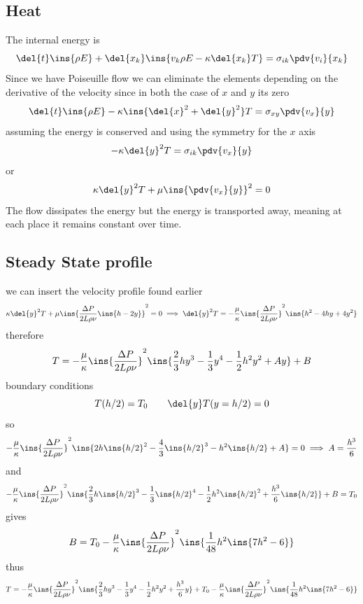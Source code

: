 \subsection{Heat}
The internal energy is 
\begin{equation}
	\del{t}\ins{\rho E}+\del{x_k}\ins{v_k\rho E - \kappa \del{x_k}T} = \sigma_{ik}\pdv{v_i}{x_k}
\end{equation}
Since we have Poiseuille flow  we can eliminate the elements depending on the derivative of the velocity since in both the case of \(x\) and \(y\) its zero
\begin{equation}
	\del{t}\ins{\rho E}-\kappa\ins{\del{x}^2+\del{y}^2}T = \sigma_{xy}\pdv{v_x}{y}
\end{equation}
assuming the energy is conserved and using the symmetry for the \(x\) axis
\begin{equation}
	-\kappa\del{y}^2T = \sigma_{ik}\pdv{v_x}{y}
\end{equation}
or 
\begin{equation}
	\kappa\del{y}^2T + \mu\ins{\pdv{v_x}{y}}^2=0
\end{equation}
The flow dissipates the energy but the energy is transported away, meaning at each place it remains constant over time.
\subsection{Steady State profile}
we can insert the velocity profile found earlier
\begin{equation}
	\kappa\del{y}^2T + \mu\ins{\frac{\Delta P}{2L\rho\nu}\ins{h-2y}}^2=0 \implies \del{y}^2T = -\frac{\mu}{\kappa}\ins{\frac{\Delta P}{2L\rho\nu}}^2\ins{h^2-4hy+4y^2}
\end{equation}
therefore
\begin{equation}
	T = -\frac{\mu}{\kappa}\ins{\frac{\Delta P}{2L\rho\nu}}^2\ins{\frac{2}{3}hy^3-\frac{1}{3}y^4-\frac{1}{2}h^2y^2+Ay}+B
\end{equation}
boundary conditions
\begin{equation}
	T(h/2)=T_0 \qquad \del{y}T(y=h/2)=0
\end{equation}
so 
\begin{equation}
	-\frac{\mu}{\kappa}\ins{\frac{\Delta P}{2L\rho\nu}}^2\ins{2h\ins{h/2}^2-\frac{4}{3}\ins{h/2}^3-h^2\ins{h/2}+A}=0 \implies A=\frac{h^3}{6}
\end{equation}
and
\begin{equation}
	-\frac{\mu}{\kappa}\ins{\frac{\Delta P}{2L\rho\nu}}^2\ins{\frac{2}{3}h\ins{h/2}^3-\frac{1}{3}\ins{h/2}^4-\frac{1}{2}h^2\ins{h/2}^2+\frac{h^3}{6}\ins{h/2}}+B=T_0
\end{equation}
gives
\begin{equation}
	B = T_0-\frac{\mu}{\kappa}\ins{\frac{\Delta P}{2L\rho\nu}}^2\ins{\frac{1}{48}h^2\ins{7h^2-6}}
\end{equation}
thus 
\begin{equation}
	T = -\frac{\mu}{\kappa}\ins{\frac{\Delta P}{2L\rho\nu}}^2\ins{\frac{2}{3}hy^3-\frac{1}{3}y^4-\frac{1}{2}h^2y^2+\frac{h^3}{6}y}+T_0-\frac{\mu}{\kappa}\ins{\frac{\Delta P}{2L\rho\nu}}^2\ins{\frac{1}{48}h^2\ins{7h^2-6}}
\end{equation}

